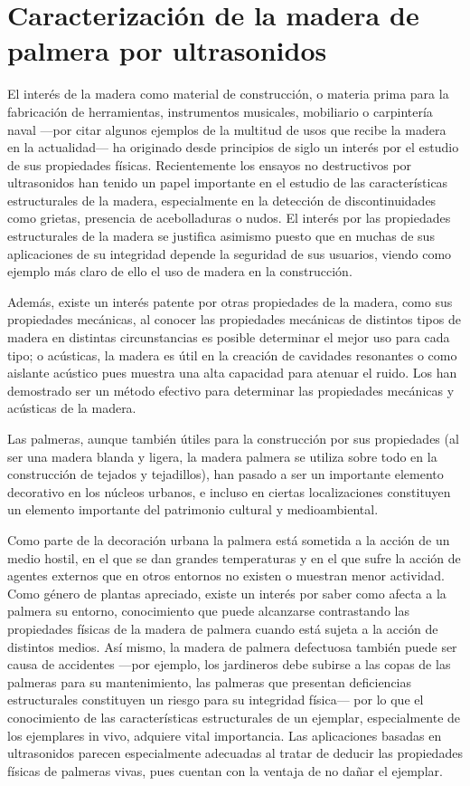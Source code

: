 \chapter{Caracterización de la madera de palmera por ultrasonidos}

El interés de la madera como material de construcción, o materia prima para
la fabricación de herramientas, instrumentos musicales, mobiliario o
carpintería naval ---por citar algunos ejemplos de la multitud de usos que
recibe la madera en la actualidad--- ha originado desde principios de siglo
un interés por el estudio de sus propiedades físicas. Recientemente los
ensayos no destructivos por ultrasonidos han tenido un papel importante en
el estudio de las características estructurales de la madera, especialmente
en la detección de discontinuidades como grietas, presencia de
acebolladuras o nudos. El interés por las propiedades estructurales de la
madera se justifica asimismo puesto que en muchas de sus aplicaciones de su
integridad depende la seguridad de sus usuarios, viendo como ejemplo más
claro de ello el uso de madera en la construcción.

Además, existe un interés patente por otras propiedades de la madera, como
sus propiedades mecánicas, al conocer las propiedades mecánicas de
distintos tipos de madera en distintas circunstancias es posible determinar
el mejor uso para cada tipo; o acústicas, la madera es útil en la creación
de cavidades resonantes o como aislante acústico pues muestra una alta
capacidad para atenuar el ruido. Los  han demostrado ser un
método efectivo para determinar las propiedades mecánicas y acústicas de la
madera.

Las palmeras, aunque también útiles para la construcción por sus
propiedades (al ser una madera blanda y ligera, la madera palmera se
utiliza sobre todo en la construcción de tejados y tejadillos), han pasado
a ser un importante elemento decorativo en los núcleos urbanos, e incluso
en ciertas localizaciones constituyen un elemento importante del patrimonio
cultural y medioambiental.

Como parte de la decoración urbana la palmera está sometida a la acción de
un medio hostil, en el que se dan grandes temperaturas y en el que sufre la
acción de agentes externos que en otros entornos no existen o muestran
menor actividad. Como género de plantas apreciado, existe un interés por
saber como afecta a la palmera su entorno, conocimiento que puede
alcanzarse contrastando las propiedades físicas de la madera de palmera
cuando está sujeta a la acción de distintos medios. Así mismo, la madera de
palmera defectuosa también puede ser causa de accidentes ---por ejemplo,
los jardineros debe subirse a las copas de las palmeras para su
mantenimiento, las palmeras que presentan deficiencias estructurales
constituyen un riesgo para su integridad física--- por lo que el
conocimiento de las características estructurales de un ejemplar,
especialmente de los ejemplares in vivo, adquiere vital importancia. Las
aplicaciones basadas en ultrasonidos parecen especialmente adecuadas al
tratar de deducir las propiedades físicas de palmeras vivas, pues cuentan
con la ventaja de no dañar el ejemplar.


